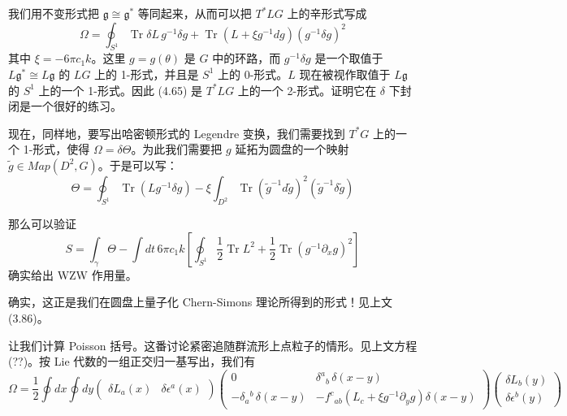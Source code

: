 我们用不变形式把 $\mathfrak{g}\cong\mathfrak{g}^*$ 等同起来，从而可以把 $T^*LG$ 上的辛形式写成
\begin{equation}
  \Omega = \oint_{S^1}\operatorname{Tr}\delta L\,g^{-1}\delta g + \operatorname{Tr}\left(L + \xi g^{-1}dg\right)\left(g^{-1}\delta g\right)^2
  \tag{4.65}
  \label{eq:4.65}
\end{equation}
其中 $\xi=-6\pi c_1 k$。这里 $g=g(\theta)$ 是 $G$ 中的环路，而 $g^{-1}\delta g$ 是一个取值于 $L\mathfrak{g}^*\cong L\mathfrak{g}$ 的 $LG$ 上的 1-形式，并且是 $S^1$ 上的 0-形式。$L$ 现在被视作取值于 $L\mathfrak{g}$ 的 $S^1$ 上的一个 1-形式。因此 (4.65) 是 $T^*LG$ 上的一个 2-形式。证明它在 $\delta$ 下封闭是一个很好的练习。

现在，同样地，要写出哈密顿形式的 Legendre 变换，我们需要找到 $T^*G$ 上的一个 1-形式，使得 $\Omega=\delta\Theta$。为此我们需要把 $g$ 延拓为圆盘的一个映射 $\tilde g\in Map(D^2,G)$。于是可以写：
\begin{equation}
  \Theta = \oint_{S^1}\operatorname{Tr}\left(Lg^{-1}\delta g\right) - \xi\int_{D^2}\operatorname{Tr}\left(\tilde g^{-1}d\tilde g\right)^2\left(\tilde g^{-1}\delta\tilde g\right)
  \tag{4.66}
  \label{eq:4.66}
\end{equation}

那么可以验证
\begin{equation}
  S = \int_\gamma\Theta - \int dt\,6\pi c_1 k\left[\oint_{S^1}\frac{1}{2}\operatorname{Tr}L^2 + \frac{1}{2}\operatorname{Tr}\left(g^{-1}\partial_x g\right)^2\right]
  \tag{4.67}
  \label{eq:4.67}
\end{equation}
确实给出 WZW 作用量。

确实，这正是我们在圆盘上量子化 Chern-Simons 理论所得到的形式！见上文 (3.86)。

让我们计算 Poisson 括号。这番讨论紧密追随群流形上点粒子的情形。见上文方程 (??)。按 Lie 代数的一组正交归一基写出，我们有
\begin{equation}
  \Omega = \frac{1}{2}\oint dx\oint dy
  \begin{pmatrix}\delta L_a(x) & \delta\epsilon^a(x)\end{pmatrix}
  \begin{pmatrix}
    0 & \delta^a{}_b\,\delta(x-y)\\[4pt]
    -\delta_a{}^b\,\delta(x-y) & -f^c{}_{ab}\left(L_c + \xi g^{-1}\partial_y g\right)\delta(x-y)
  \end{pmatrix}
  \begin{pmatrix}\delta L_b(y)\\ \delta\epsilon^b(y)\end{pmatrix}
  \tag{4.68}
  \label{eq:4.68}
\end{equation}

